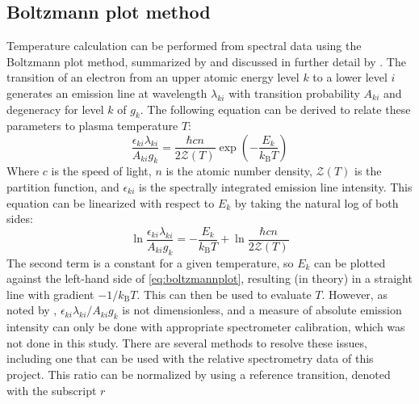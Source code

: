         \subsection{Boltzmann plot method}
            Temperature calculation can be performed from spectral data using the Boltzmann plot method, summarized by \textcite{ohnoValidityElectronTemperature2006} and discussed in further detail by \textcite{griemSpectroscopicTemperatureMeasurements1997}. The transition of an electron from an upper atomic energy level $k$ to a lower level $i$  generates an emission line at wavelength $\lambda_{ki}$ with transition probability $A_{ki}$ and degeneracy for level $k$ of $g_k$. The following equation can be derived to relate these parameters to plasma temperature $T$:
            \begin{equation} \label{eq:transition_energy}
                \frac{\epsilon_{ki}\lambda_{ki}}{A_{ki}g_k} = \frac{\hbar cn}{2 \mathcal{Z}(T)}\exp{\left(-\frac{E_k}{k_\mathrm{B}T}\right)}
            \end{equation}
            Where $c$ is the speed of light, $n$ is the atomic number density, $\mathcal{Z}(T)$ is the partition function, and $\epsilon_{ki}$ is the spectrally integrated emission line intensity. This equation can be linearized with respect to $E_k$ by taking the natural log of both sides:
            \begin{equation} \label{eq:boltzmannplot}
                \ln{\frac{\epsilon_{ki}\lambda_{ki}}{A_{ki}g_k}} = -\frac{E_k}{k_\mathrm{B}T} + \ln{\frac{\hbar cn}{2 \mathcal{Z}(T)}}
            \end{equation}
            The second term is a constant for a given temperature, so $E_k$ can be plotted against the left-hand side of \autoref{eq:boltzmannplot}, resulting (in theory) in a straight line with gradient $-1/k_\mathrm{B}T$. This can then be used to evaluate $T$. However, as noted by \textcite{volkerImportancePhysicalUnits2022}, $\epsilon_{ki}\lambda_{ki}/A_{ki}g_k$ is not dimensionless, and a measure of absolute emission intensity can only be done with appropriate spectrometer calibration, which was not done in this study. There are several methods to resolve these issues, including one that can be used with the relative spectrometry data of this project. This ratio can be normalized by using a reference transition, denoted with the subscript $r$
